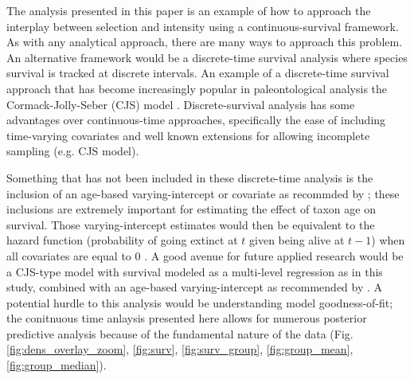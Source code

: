 \documentclass[11pt]{article}
\begin{document}
The analysis presented in this paper is an example of how to approach the interplay between selection and intensity using a continuous-survival framework. As with any analytical approach, there are many ways to approach this problem. An alternative framework would be a discrete-time survival analysis \citep{Tutz2016} where species survival is tracked at discrete intervals. An example of a discrete-time survival approach that has become increasingly popular in paleontological analysis the Cormack-Jolly-Seber (CJS) model \citep{Royle2008,Liow2008,Tomiya2013,Liow2010b}. Discrete-survival analysis has some advantages over continuous-time approaches, specifically the ease of including time-varying covariates and well known extensions for allowing incomplete sampling (e.g. CJS model). 

Something that has not been included in these discrete-time analysis is the inclusion of an age-based varying-intercept or covariate as recommded by \citet{Tutz2016}; these inclusions are extremely important for estimating the effect of taxon age on survival. Those varying-intercept estimates would then be equivalent to the hazard function (probability of going extinct at \(t\) given being alive at \(t - 1\)) when all covariates are equal to 0 \citep{Tutz2016}. A good avenue for future applied research would be a CJS-type model with survival modeled as a multi-level regression as in this study, combined with an age-based varying-intercept as recommended by \citep{Tutz2016}. A potential hurdle to this analysis would be understanding model goodness-of-fit; the conitnuous time anlaysis presented here allows for numerous posterior predictive analysis because of the fundamental nature of the data (Fig. \ref{fig:dens_overlay_zoom}, \ref{fig:surv}, \ref{fig:surv_group}, \ref{fig:group_mean}, \ref{fig:group_median}).

\end{document}
